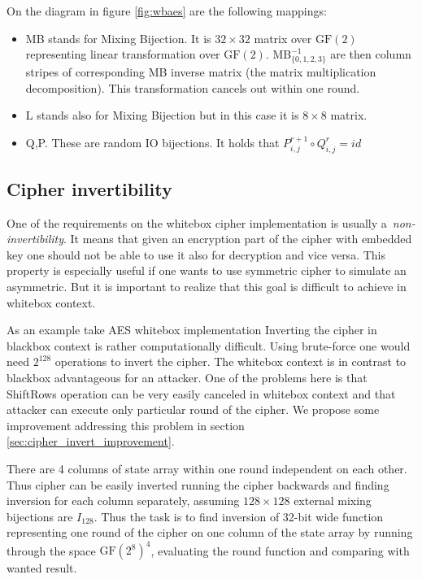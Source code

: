 \documentclass[11pt,oneside,final]{fithesis2}
\begin{document}
    On the diagram in figure \ref{fig:wbaes} are the following mappings:
    \begin{itemize}
    \item MB stands for Mixing Bijection. It is $32 \times 32$ matrix over $\text{GF}(2)$ representing linear transformation over $\text{GF}(2)$. 
    $\text{MB}^{-1}_{\{0,1,2,3\}}$ are then column stripes of corresponding MB inverse matrix (the matrix multiplication decomposition).
    This transformation cancels out within one round. 
    \item L stands also for Mixing Bijection but in this case it is $8 \times 8$ matrix.
    \item Q,P. These are random IO bijections. It holds that $P^{r+1}_{i,j} \circ Q^{r}_{i,j} = id$
    \end{itemize}

    \subsection{Cipher invertibility}\label{sec:cipher_invertibility}
    One of the requirements on the whitebox cipher implementation is usually a~\emph{non-invertibility}. It means that given an encryption part of the cipher 
    with embedded key one should not be able to use it also for decryption and vice versa. This property is especially useful if one wants to use symmetric
    cipher to simulate an asymmetric. But it is important to realize that this goal is difficult to achieve in whitebox context.
    
    As an example take AES whitebox implementation
    Inverting the cipher in blackbox context is rather computationally difficult. Using brute-force one would
    need $2^{128}$ operations to invert the cipher. The whitebox context is in contrast to blackbox advantageous for an attacker. One of the problems here is 
    that ShiftRows operation can be very easily canceled in whitebox context and that attacker can execute only particular round of the cipher. 
    We propose some improvement addressing this problem in section \ref{sec:cipher_invert_improvement}.

    There are 4 columns of state array within one round independent on each other.
    Thus cipher can be easily inverted running the cipher backwards and finding inversion for each column separately, assuming $128\times128$ external mixing bijections
    are $I_{128}$. Thus the task is to find 
    inversion of 32-bit wide function representing one round of the cipher on one column of the state array by running through the space $\text{GF}\left(2^8\right)^4$,
    evaluating the round function and comparing with wanted result.
    
\end{document}
